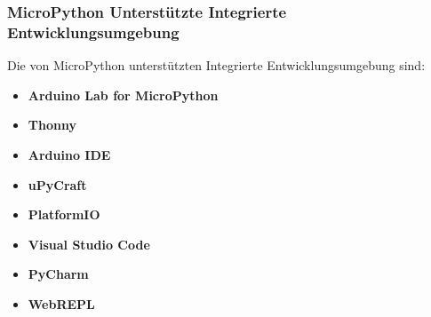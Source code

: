 \subsubsection{MicroPython Unterstützte Integrierte Entwicklungsumgebung}
Die von MicroPython unterstützten Integrierte Entwicklungsumgebung sind:
\begin{itemize}
	\item \textbf{Arduino Lab for MicroPython}
	\item \textbf{Thonny}
	\item \textbf{Arduino IDE}
	\item \textbf{uPyCraft}
	\item \textbf{PlatformIO}
	\item \textbf{Visual Studio Code}
	\item \textbf{PyCharm}
	\item \textbf{WebREPL}
	
\end{itemize}

